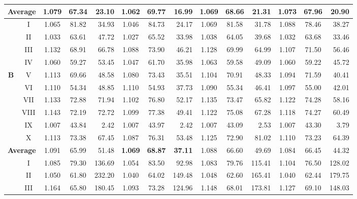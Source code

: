 \begin{sidewaystable}[h!]
\begin{center}
\begin{scriptsize}
\begin{tabular}{|c|c|c|c|r|c|c|r|c|c|r|c|c|r|}
\multicolumn{2}{|c|}{\textbf{Average}} & 1.079 & 67.34 & 23.10 & \textbf{1.062} & \textbf{69.77} & \textbf{16.99}%
                                       & 1.069 & 68.66 & 21.31 & 1.073 & 67.96 & 20.90 \\\hline\hline%
           &     I & 1.065 & 81.82 &   34.93 & 1.046 & 84.73 &   24.17 & 1.069 & 81.58 &   31.78 & 1.088 & 78.46 &   38.27 \\%
           &    II & 1.033 & 63.61 &   47.72 & 1.027 & 65.52 &   33.98 & 1.038 & 64.05 &   39.68 & 1.032 & 63.68 &   33.46 \\%
           &   III & 1.132 & 68.91 &   66.78 & 1.088 & 73.90 &   46.21 & 1.128 & 69.99 &   64.99 & 1.107 & 71.50 &   56.46 \\%
           &    IV & 1.060 & 59.27 &   53.45 & 1.047 & 61.70 &   35.98 & 1.063 & 59.58 &   49.09 & 1.060 & 59.22 &   45.72 \\%
\textbf{B} &     V & 1.113 & 69.66 &   48.58 & 1.080 & 73.43 &   35.51 & 1.104 & 70.91 &   48.33 & 1.094 & 71.59 &   40.41 \\%
           &    VI & 1.110 & 54.34 &   48.85 & 1.110 & 54.93 &   37.73 & 1.090 & 55.34 &   46.41 & 1.097 & 55.00 &   42.01 \\%
           &   VII & 1.133 & 72.88 &   71.94 & 1.102 & 76.80 &   52.17 & 1.135 & 73.47 &   65.82 & 1.122 & 74.28 &   58.16 \\%
           &  VIII & 1.143 & 72.19 &   72.72 & 1.099 & 77.38 &   49.41 & 1.122 & 75.08 &   67.28 & 1.118 & 74.27 &   60.49 \\%
           &    IX & 1.007 & 43.84 &    2.42 & 1.007 & 43.97 &    2.42 & 1.007 & 43.09 &    2.53 & 1.007 & 43.30 &    3.79 \\%
           &     X & 1.113 & 73.38 &   67.45 & 1.087 & 76.31 &   53.48 & 1.125 & 72.90 &   81.02 & 1.110 & 73.23 &   64.39 \\\hline%
\multicolumn{2}{|c|}{\textbf{Average}} & 1.091 & 65.99 & 51.48 & \textbf{1.069} & \textbf{68.87} & \textbf{37.11}%
                                       & 1.088 & 66.60 & 49.69 & 1.084 & 66.45 & 44.32 \\\hline\hline%
           &     I & 1.085 & 79.30 &  136.69 & 1.054 & 83.50 &   92.98 & 1.083 & 79.76 &  115.41 & 1.104 & 76.50 &  128.02 \\%
           &    II & 1.050 & 61.80 &  232.20 & 1.040 & 64.02 &  149.48 & 1.048 & 62.60 &  165.41 & 1.040 & 62.44 &  179.75 \\%
           &   III & 1.164 & 65.80 &  180.45 & 1.093 & 73.28 &  124.96 & 1.148 & 68.01 &  173.81 & 1.127 & 69.10 &  148.03 \\%

\end{tabular}
\end{scriptsize}
\end{center}
\end{sidewaystable}
